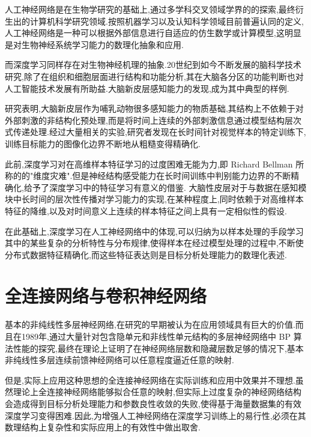 人工神经网络是在生物学研究的基础上,通过多学科交叉领域学界的的探索,最终衍生出的计算机科学研究领域.按照机器学习以及认知科学领域目前普遍认同的定义,人工神经网络是一种可以根据外部信息进行自适应的仿生数学或计算模型,这明显是对生物神经系统学习能力的数理化抽象和应用.

而深度学习同样存在对生物神经机理的抽象.20世纪到如今不断发展的脑科学技术研究,除了在组织和细胞层面进行结构和功能分析,其在大脑各分区的功能判断也对人工智能技术发展有所助益.大脑新皮层感知能力的发现,成为其中典型的样例.

研究表明,大脑新皮层作为哺乳动物很多感知能力的物质基础,其结构上不依赖于对外部刺激的非结构化预处理,而是将时间上连续的外部刺激信息通过模型结构层次式传递处理.经过大量相关的实验,研究者发现在长时间针对视觉样本的特定训练下,训练目标能力的图像化边界不断地从粗糙变得精确化.

此前,深度学习对在高维样本特征学习的过度困难无能为力,即 Richard Bellman 所称的的"维度灾难".但是神经结构感受能力在长时间训练中判别能力边界的不断精确化,给予了深度学习中的特征学习有意义的借鉴. 大脑性皮层对于与数据在感知模块中长时间的层次性传播对学习能力的实现,在某种程度上,同时依赖于对高维样本特征的降维,以及对时间意义上连续的样本特征之间上具有一定相似性的假设.

在此基础上,深度学习在人工神经网络中的体现,可以归纳为以样本处理的手段学习其中的某些复杂的分析特性与分布规律,使得样本在经过模型处理的过程中,不断使分布式数据特征精确化,而这些特征表达则是目标分析处理能力的数理化表述.

\section{全连接网络与卷积神经网络}
基本的非纯线性多层神经网络,在研究的早期被认为在应用领域具有巨大的价值.而且在1989年,通过大量针对包含隐单元和非线性单元结构的多层神经网络中 BP 算法性能的探究,最终在理论上证明了在神经网络层数和隐藏层数足够的情况下,基本非纯线性多层连续前馈神经网络可以任意程度逼近任意的映射.

但是,实际上应用这种思想的全连接神经网络在实际训练和应用中效果并不理想.虽然理论上全连接神经网络能够拟合任意的映射,但实际上过度复杂的神经网络结构会造成得到目标分析处理能力和参数良性收敛的失败,使得基于海量数据集的有效深度学习变得困难.因此,为增强人工神经网络在深度学习训练上的易行性,必须在其数理结构上复杂性和实际应用上的有效性中做出取舍.

